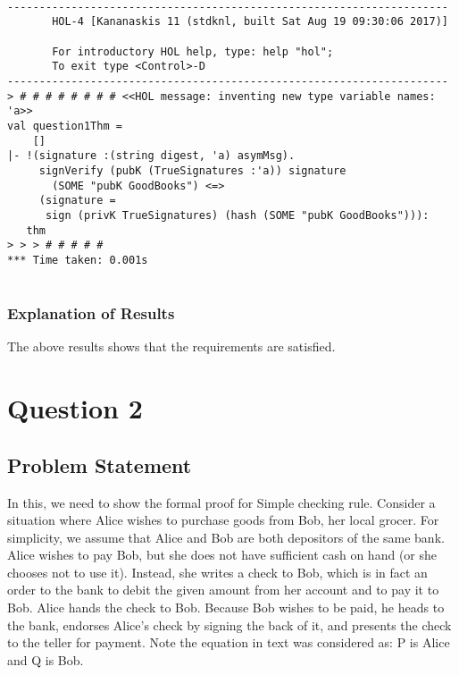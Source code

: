 \documentclass{report}
\begin{document}
\setcounter{sessioncount}{0}
\begin{session}
  \begin{scriptsize}
\begin{verbatim}

---------------------------------------------------------------------
       HOL-4 [Kananaskis 11 (stdknl, built Sat Aug 19 09:30:06 2017)]

       For introductory HOL help, type: help "hol";
       To exit type <Control>-D
---------------------------------------------------------------------
> # # # # # # # # <<HOL message: inventing new type variable names: 'a>>
val question1Thm =
    []
|- !(signature :(string digest, 'a) asymMsg).
     signVerify (pubK (TrueSignatures :'a)) signature
       (SOME "pubK GoodBooks") <=>
     (signature =
      sign (privK TrueSignatures) (hash (SOME "pubK GoodBooks"))):
   thm
> > > # # # # # 
*** Time taken: 0.001s
 
\end{verbatim}
  \end{scriptsize}
\end{session}

\subsection{Explanation of Results}
\label{sec:explanation-results-1}
The above results shows that the requirements are satisfied.


 \chapter{Question 2}
 \label{cha:ques2}
  
 \section{Problem Statement}
 \label{sec:problem-statement-2}

 In this, we need to show the formal proof for Simple checking rule.
 Consider a situation where Alice wishes to purchase goods from Bob,
 her local grocer.  For simplicity, we assume that Alice and Bob are
 both depositors of the same bank. Alice wishes to pay Bob, but she
 does not have sufficient cash on hand (or she chooses not to use
 it). Instead, she writes a check to Bob, which is in fact an order to
 the bank to debit the given amount from her account and to pay it to
 Bob. Alice hands the check to Bob. Because Bob wishes to be paid, he
 heads to the bank, endorses Alice’s check by signing the back of it,
 and presents the check to the teller for payment.
 Note the equation in text was considered as: P is Alice and Q is Bob.
\end{document}
